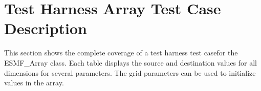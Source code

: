 \section{Test Harness Array Test Case Description}
This section shows the complete coverage of a test harness test casefor the ESMF\_Array class. 
Each table displays the source and destination values for all dimensions for several parameters.  
The grid parameters can be used to initialize values in the array.  \\



